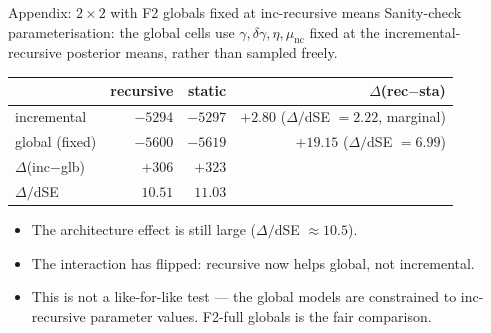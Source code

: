 \documentclass[10pt,aspectratio=169]{beamer}
\newcommand{\emp}[1]{\textcolor{CSP-emphasis}{\textbf{#1}}}
\begin{document}
\begin{frame}{Appendix: $2\!\times\!2$ with F2 globals fixed at inc-recursive means}
\small
Sanity-check parameterisation: the global cells use $\gamma, \delta\gamma, \eta, \mu_\mathrm{nc}$ fixed at the incremental-recursive posterior means, rather than sampled freely.

\vspace{0.6em}
\begin{center}
\begin{tabular}{l|rr|r}
\toprule
              & recursive & static & $\Delta$(rec$-$sta) \\
\midrule
incremental   & $-5294$ & $-5297$ & $+2.80$ ($\Delta/$dSE $= 2.22$, marginal) \\
global (fixed)& $-5600$ & $-5619$ & \emp{$+19.15$} ($\Delta/$dSE $= 6.99$) \\
\midrule
$\Delta$(inc$-$glb) & $+306$ & $+323$ & \\
$\Delta/$dSE        & $10.51$ & $11.03$ & \\
\bottomrule
\end{tabular}
\end{center}

\vspace{0.6em}
\begin{itemize}\itemsep0.15em
  \item The architecture effect is still large ($\Delta/$dSE $\approx 10.5$).
  \item The interaction has flipped: recursive now helps global, not incremental.
  \item This is not a like-for-like test --- the global models are constrained to inc-recursive parameter values. F2-full globals is the fair comparison.
\end{itemize}
\end{frame}
\end{document}
